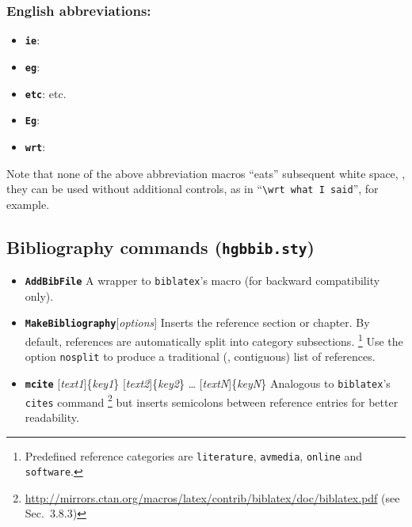 \documentclass[english]{hgbarticle}
\begin{document}
\subsubsection*{English abbreviations:}

\begin{itemize}
    \item \textbf{\texttt{{\bs}ie}}: \ie
    \item \textbf{\texttt{{\bs}eg}}: \eg
    \item \textbf{\texttt{{\bs}etc}}: etc.
    \item \textbf{\texttt{{\bs}Eg}}: \Eg
    \item \textbf{\texttt{{\bs}wrt}}: \wrt
\end{itemize}

\noindent
Note that none of the above abbreviation macros ``eats'' subsequent white
space, \ie, they can be used without additional controls, as in
``\verb!\wrt what I said!'', for example.

\subsection{Bibliography commands (\texttt{hgbbib.sty})}

\begin{itemize}
    \item 
    \textbf{\texttt{{\bs}AddBibFile}}\newline
    A wrapper to \texttt{biblatex}'s \verb!! macro (for backward compatibility only).
    \item
    \textbf{\texttt{{\bs}MakeBibliography}}[\emph{options}]
    \newline
    Inserts the
    reference section or chapter. By default, references are automatically
    split into category subsections.%
    \footnote{Predefined reference categories are \texttt{literature},
        \texttt{avmedia}, \texttt{online} and \texttt{software}.}
    Use the option \texttt{nosplit} to produce a traditional (\ie,
    contiguous) list of references.
    \item
    \textbf{\texttt{{\bs}mcite}}%
        [\emph{text1}]\{\emph{key1}\}%
        [\emph{text2}]\{\emph{key2}\}%
        \ldots
        [\emph{textN}]\{\emph{keyN}\}%
    \newline
    Analogous to \texttt{bib\-la\-tex}'s \texttt{{\bs}cites} command%
    \footnote{%
    \url{http://mirrors.ctan.org/macros/latex/contrib/biblatex/doc/biblatex.pdf}
    (see Sec.~3.8.3)} but inserts semicolons between reference entries for
    better readability.
\end{itemize}
\end{document}
